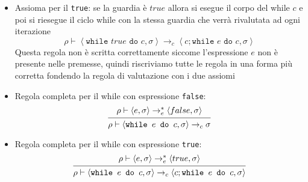 \documentclass[a4paper]{article}
\begin{document}
\begin{itemize}
\begin{itemize}
      \item Assioma per il \texttt{true}: se la guardia è \( true \) allora si esegue
        il corpo del while \( c \) e poi si riesegue il ciclo while con la stessa guardia
        che verrà rivalutata ad ogni iterazione
        \[
          \rho \vdash \left< \texttt{while } true \texttt{ do } c, \sigma  \right> 
          \to_c
          \left< c; \texttt{while } e \texttt{ do } c, \sigma  \right>
        \] 
        Questa regola non è scritta correttamente siccome l'espressione \( e \) non
        è presente nelle premesse, quindi riscriviamo tutte le regola in una forma più
        corretta fondendo la regola di valutazione con i due assiomi

      \item Regola completa per il while con espressione \texttt{false}:
        \[
        \begin{prooftree}
          \hypo{ 
            \rho \vdash \left< e, \sigma  \right> \to^*_e \left< false, \sigma  \right>
          }
          \infer1{ 
            \rho \vdash \left< \texttt{while } e \texttt{ do } c, \sigma  \right> \to_c
            \sigma
          }
        \end{prooftree}
        \] 

      \item Regola completa per il while con espressione \texttt{true}:
        \[
          \begin{prooftree}
            \hypo{ 
              \rho \vdash \left< e, \sigma  \right> \to^*_e \left< true, \sigma  \right>
            }
            \infer1{ 
              \rho \vdash \left< \texttt{while } e \texttt{ do } c, \sigma  \right> \to_c
              \left< c; \texttt{while } e \texttt{ do } c, \sigma  \right>
            }
          \end{prooftree}
        \] 
    \end{itemize}
\end{itemize}
\end{document}
